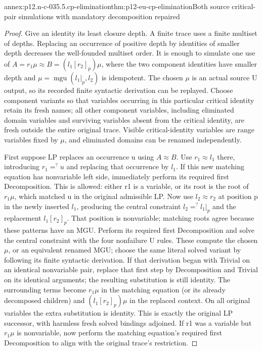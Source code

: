 \begin{annexitem}{annex:p12.n-c-035.5.cp-elimination}{thm:p12-eu-cp-elimination}{Both source critical-pair simulations with mandatory decomposition repaired}
\begin{proof}
Give an identity its least closure depth. A finite trace uses a finite
multiset of depths. Replacing an occurrence of positive depth by
identities of smaller depth decreases the well-founded multiset order.
It is enough to simulate one use of
\(A=r_1\mu\approx B=(l_1[r_2]_p)\mu\), where the two
component identities have smaller depth and
\(\mu=\operatorname{mgu}(l_1|_p,l_2)\) is idempotent.
The chosen \(\mu\) is an actual source U output, so its recorded
finite syntactic derivation can be replayed. Choose component
variants so that variables occurring in this particular critical
identity retain its fresh names; all other component variables,
including eliminated domain variables and surviving variables absent
from the critical identity, are fresh outside the entire original
trace. Visible critical-identity variables are range variables
fixed by \(\mu\), and eliminated domains can be renamed independently.

First suppose LP replaces an occurrence u using \(A\approx B\).
Use \(r_1\approx l_1\) there, introducing \(r_1=^{?}u\)
and replacing that occurrence by \(l_1\). If this new matching
equation has nonvariable left side, immediately perform its required
first Decomposition. This is allowed: either r1 is a variable, or
its root is the root of \(r_1\mu\), which matched u in the
original admissible LP. Now use \(l_2\approx r_2\) at position
p in the newly inserted \(l_1\), producing the central constraint
\(l_2=^{?}l_1|_p\) and the replacement \(l_1[r_2]_p\).
That position is nonvariable; matching roots agree because these
patterns have an MGU. Perform its required first Decomposition
and solve the central constraint with the four nonfailure U rules.
These compute the chosen \(\mu\), or an equivalent renamed MGU;
choose the same literal solved variant by following its finite
syntactic derivation. If that derivation began with Trivial on an
identical nonvariable pair, replace that first step by Decomposition
and Trivial on its identical arguments; the resulting substitution
is still identity. The surrounding terms become
\(r_1\mu\) in the matching equation (or its already decomposed
children) and \((l_1[r_2]_p)\mu\) in the replaced context.
On all original variables the extra substitution is identity.
This is exactly the original LP successor, with harmless fresh
solved bindings adjoined. If r1 was a variable but \(r_1\mu\)
is nonvariable, now perform the matching equation's required first
Decomposition to align with the original trace's restriction.


\end{proof}
\end{annexitem}
